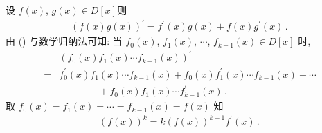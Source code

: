 \begin{proposition}
    设 $f(x)$, $g(x) \in D[x]$\period 则
    \begin{align*}
        (f(x) g(x))^{\prime} = f^{\prime} (x) g(x) + f(x) g^{\prime} (x) \period \tag*{(\myStar)}
    \end{align*}
    由 (\myStar) 与数学归纳法可知: 当 $f_0 (x)$, $f_1 (x)$, $\cdots$, $f_{k-1} (x) \in D[x]$ 时,
    \begin{align*}
             & (f_0 (x) f_1 (x) \cdots f_{k-1} (x))^{\prime}                                                      \\
        = {} & f_0^{\prime} (x) f_1 (x) \cdots f_{k-1} (x) + f_0 (x) f_1^{\prime} (x) \cdots f_{k-1} (x) + \cdots \\
             & \qquad \qquad + f_0 (x) f_1 (x) \cdots f_{k-1}^{\prime} (x) \period
    \end{align*}
    取 $f_0 (x) = f_1 (x) = \cdots = f_{k-1} (x) = f(x)$ 知
    \begin{align*}
        (f(x))^k = k(f(x))^{k-1} f^{\prime} (x) \period
    \end{align*}
\end{proposition}

